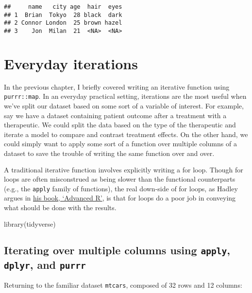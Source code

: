 \documentclass[
]{book}
\newenvironment{Shaded}{\begin{snugshade}}{\end{snugshade}}
\newcommand{\FunctionTok}[1]{\textcolor[rgb]{0.00,0.00,0.00}{#1}}
\newcommand{\NormalTok}[1]{#1}
\begin{document}
\begin{verbatim}
##     name   city age  hair  eyes
## 1  Brian  Tokyo  28 black  dark
## 2 Connor London  25 brown hazel
## 3    Jon  Milan  21  <NA>  <NA>
\end{verbatim}

\hypertarget{everyday-iterations}{%
\chapter{Everyday iterations}\label{everyday-iterations}}

In the previous chapter, I briefly covered writing an iterative function using \texttt{purrr::map}. In an everyday practical setting, iterations are the most useful when we've split our dataset based on some sort of a variable of interest. For example, say we have a dataset containing patient outcome after a treatment with a therapeutic. We could split the data based on the type of the therapeutic and iterate a model to compare and contrast treatment effects. On the other hand, we could simply want to apply some sort of a function over multiple columns of a dataset to save the trouble of writing the same function over and over.

A traditional iterative function involves explicitly writing a for loop. Though for loops are often misconstrued as being slower than the functional counterparts (e.g., the \texttt{apply} family of functions), the real down-side of for loops, as Hadley argues in \href{https://adv-r.hadley.nz/functionals.html}{his book, `Advanced R'}, is that for loops do a poor job in conveying what should be done with the results.

\begin{Shaded}
\begin{Highlighting}[]
\FunctionTok{library}\NormalTok{(tidyverse)}
\end{Highlighting}
\end{Shaded}

\hypertarget{iterating-over-multiple-columns-using-apply-dplyr-and-purrr}{%
\section{\texorpdfstring{Iterating over multiple columns using \texttt{apply}, \texttt{dplyr}, and \texttt{purrr}}{Iterating over multiple columns using apply, dplyr, and purrr}}\label{iterating-over-multiple-columns-using-apply-dplyr-and-purrr}}

Returning to the familiar dataset \texttt{mtcars}, composed of 32 rows and 12 columns:
\end{document}

